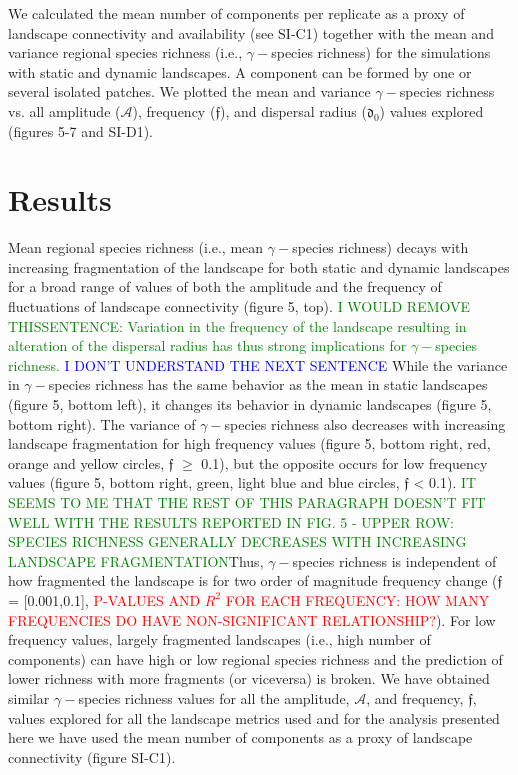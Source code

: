 \documentclass[12pt]{article}
\newcommand{\carlos}[1]{\textcolor{Red}{#1}}
\newcommand{\GM}[1]{\textcolor{Blue}{#1}}
\newcommand{\JK}[1]{\textcolor{Green}{#1}}
\begin{document}
We calculated the mean number of components per replicate as a proxy of landscape connectivity and availability (see SI-C1) together with the mean and variance regional species richness (i.e., $\gamma-$species richness) for the simulations with static and dynamic landscapes. A component can be formed by one or several isolated patches. We plotted the mean and variance $\gamma-$species richness vs. all amplitude ($\mathcal{A}$), frequency ($\mathfrak{f}$), and dispersal radius ($\mathfrak{d_{0}}$) values explored (figures 5-7 and SI-D1). 

\section*{Results}

Mean regional species richness (i.e., mean $\gamma-$species richness) decays with increasing fragmentation of the landscape for both static and dynamic landscapes for a broad range of values of both the amplitude and the frequency of fluctuations of landscape connectivity (figure 5, top). \JK{I WOULD REMOVE THISSENTENCE: Variation in the frequency of the landscape resulting in alteration of the dispersal radius has thus strong implications for $\gamma-$species richness.} \GM{I DON'T UNDERSTAND THE NEXT SENTENCE} While the variance in $\gamma-$species richness has the same behavior as the mean in static landscapes (figure 5, bottom left), it changes its behavior in dynamic landscapes (figure 5, bottom right). The variance of $\gamma-$species richness also decreases with increasing landscape fragmentation for high frequency values (figure 5, bottom right, red, orange and yellow circles, $\mathfrak{f}$ $\geq$ 0.1), but the opposite occurs for low frequency values (figure 5, bottom right, green, light blue and blue circles, $\mathfrak{f}$ < 0.1). \JK{IT SEEMS TO ME THAT THE REST OF THIS PARAGRAPH DOESN'T FIT WELL WITH THE RESULTS REPORTED IN FIG. 5 - UPPER ROW: SPECIES RICHNESS GENERALLY DECREASES WITH INCREASING LANDSCAPE FRAGMENTATION}Thus, $\gamma-$species richness is independent of how fragmented the landscape is for two order of magnitude frequency change ($\mathfrak{f}$ = [0.001,0.1], \carlos{P-VALUES AND $R^2$ FOR EACH FREQUENCY: HOW MANY FREQUENCIES DO HAVE NON-SIGNIFICANT RELATIONSHIP?}). For low frequency values, largely fragmented landscapes (i.e., high number of components) can have high or low regional species richness and the prediction of lower richness with more fragments (or viceversa) is broken. We have obtained similar $\gamma-$species richness values for all the amplitude, $\mathcal{A}$, and frequency, $\mathfrak{f}$, values explored for all the landscape metrics used and for the analysis presented here we have used the mean number of components as a proxy of landscape connectivity (figure SI-C1).
\end{document}
